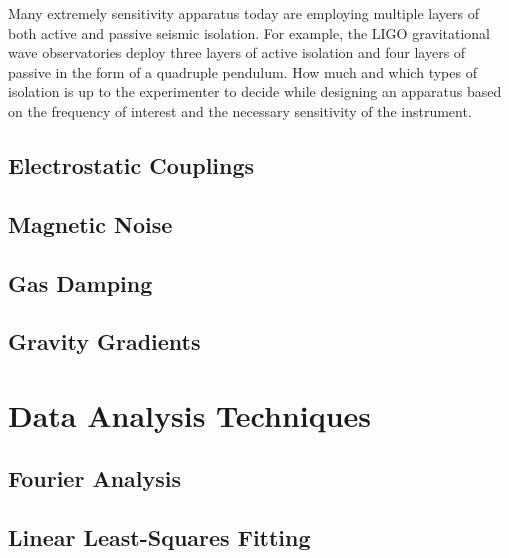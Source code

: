 \documentclass{book}
\begin{document}
Many extremely sensitivity apparatus today are employing multiple layers of both active and passive seismic isolation. For example, the LIGO gravitational wave observatories deploy three layers of active isolation and four layers of passive in the form of a quadruple pendulum. How much and which types of isolation is up to the experimenter to decide while designing an apparatus based on the frequency of interest and the necessary sensitivity of the instrument.

\section{Electrostatic Couplings}\label{elect}
\section{Magnetic Noise}
\section{Gas Damping} \label{gas}
\section{Gravity Gradients}\label{gravGrad}

\chapter{Data Analysis Techniques}
\section{Fourier Analysis}
\section{Linear Least-Squares Fitting}



\end{document}
